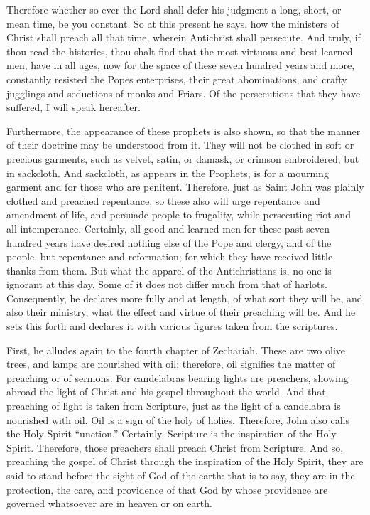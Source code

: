 Therefore whether so ever the Lord shall defer his judgment a long, short, or mean time, be you constant. So at this present he says, how the ministers of Christ shall preach all that time, wherein Antichrist shall persecute. And truly, if thou read the histories, thou shalt find that the most virtuous and best learned men, have in all ages, now for the space of these seven hundred years and more, constantly resisted the Popes enterprises, their great abominations, and crafty jugglings and seductions of monks and Friars. Of the persecutions that they have suffered, I will speak hereafter.

Furthermore, the appearance of these prophets is also shown, so that the manner of their doctrine may be understood from it. They will not be clothed in soft or precious garments, such as velvet, satin, or damask, or crimson embroidered, but in sackcloth. And sackcloth, as appears in the Prophets, is for a mourning garment and for those who are penitent. Therefore, just as Saint John was plainly clothed and preached repentance, so these also will urge repentance and amendment of life, and persuade people to frugality, while persecuting riot and all intemperance. Certainly, all good and learned men for these past seven hundred years have desired nothing else of the Pope and clergy, and of the people, but repentance and reformation; for which they have received little thanks from them. But what the apparel of the Antichristians is, no one is ignorant at this day. Some of it does not differ much from that of harlots. Consequently, he declares more fully and at length, of what sort they will be, and also their ministry, what the effect and virtue of their preaching will be. And he sets this forth and declares it with various figures taken from the scriptures.

First, he alludes again to the fourth chapter of Zechariah. These are two olive trees, and lamps are nourished with oil; therefore, oil signifies the matter of preaching or of sermons. For candelabras bearing lights are preachers, showing abroad the light of Christ and his gospel throughout the world. And that preaching of light is taken from Scripture, just as the light of a candelabra is nourished with oil. Oil is a sign of the holy of holies. Therefore, John also calls the Holy Spirit “unction.” Certainly, Scripture is the inspiration of the Holy Spirit. Therefore, those preachers shall preach Christ from Scripture. And so, preaching the gospel of Christ through the inspiration of the Holy Spirit, they are said to stand before the sight of God of the earth: that is to say, they are in the protection, the care, and providence of that God by whose providence are governed whatsoever are in heaven or on earth.

